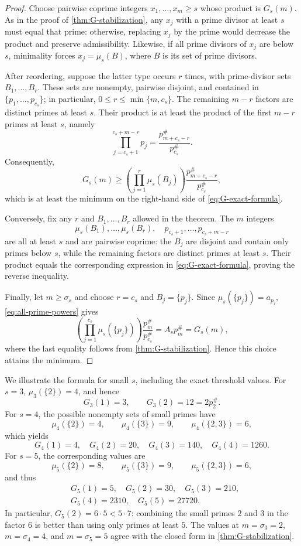 \documentclass[11pt,onecolumn]{IEEEtran}
\newcommand{\primorial}[1]{p_{#1}^{\#}}
\begin{document}
\begin{proof}
Choose pairwise coprime integers $x_1,\ldots,x_m\ge s$
whose product is $G_s(m)$.  As in the proof of
\cref{thm:G-stabilization}, any $x_j$ with a prime divisor
at least $s$ must equal that prime: otherwise, replacing
$x_j$ by the prime would decrease the product and preserve
admissibility.  Likewise, if all prime divisors of $x_j$
are below $s$, minimality forces $x_j=\mu_s(B)$, where
$B$ is its set of prime divisors.

After reordering, suppose the latter type occurs $r$ times,
with prime-divisor sets $B_1,\ldots,B_r$.  These sets are
nonempty, pairwise disjoint, and contained in
$\{p_1,\ldots,p_{c_s}\}$; in particular,
$0\le r\le\min\{m,c_s\}$.  The remaining $m-r$ factors
are distinct primes at least $s$.  Their product is at least
the product of the first $m-r$ primes at least $s$, namely
\[
\prod_{j=c_s+1}^{c_s+m-r}p_j
=\frac{\primorial{m+c_s-r}}{\primorial{c_s}}.
\]
Consequently,
\[
G_s(m)\ge
\left(\prod_{j=1}^{r}\mu_s(B_j)\right)
\frac{\primorial{m+c_s-r}}{\primorial{c_s}},
\]
which is at least the minimum on the right-hand side of
\eqref{eq:G-exact-formula}.

Conversely, fix any $r$ and $B_1,\ldots,B_r$ allowed
in the theorem.  The $m$ integers
\[
\mu_s(B_1),\ldots,\mu_s(B_r),
\quad p_{c_s+1},\ldots,p_{c_s+m-r}
\]
are all at least $s$ and are pairwise coprime: the
$B_j$ are disjoint and contain only primes below $s$,
while the remaining factors are distinct primes at least
$s$.  Their product equals the corresponding expression
in \eqref{eq:G-exact-formula}, proving the reverse
inequality.

Finally, let $m\ge\sigma_s$ and choose $r=c_s$ and
$B_j=\{p_j\}$.  Since $\mu_s(\{p_j\})=a_{p_j}$,
\eqref{eq:all-prime-powers} gives
\[
\left(\prod_{j=1}^{c_s}\mu_s(\{p_j\})\right)
\frac{\primorial{m}}{\primorial{c_s}}
=A_s\primorial{m}=G_s(m),
\]
where the last equality follows from
\cref{thm:G-stabilization}.  Hence this choice attains
the minimum.
\end{proof}

We illustrate the formula for small $s$, including the exact
threshold values.
For $s=3$, $\mu_3(\{2\})=4$, and hence
\[
G_3(1)=3,\qquad G_3(2)=12=2\primorial{2}.
\]
For $s=4$, the possible nonempty sets of small primes
have
\[
\mu_4(\{2\})=4,\qquad
\mu_4(\{3\})=9,\qquad
\mu_4(\{2,3\})=6,
\]
which yields
\[
G_4(1)=4,\quad G_4(2)=20,\quad
G_4(3)=140,\quad G_4(4)=1260.
\]
For $s=5$, the corresponding values are
\[
\mu_5(\{2\})=8,\qquad
\mu_5(\{3\})=9,\qquad
\mu_5(\{2,3\})=6,
\]
and thus
\[
\begin{aligned}
&G_5(1)=5,\quad G_5(2)=30,\quad G_5(3)=210,\\
&G_5(4)=2310,\quad G_5(5)=27720.
\end{aligned}
\]
In particular, $G_5(2)=6\cdot5<5\cdot7$: combining the
small primes $2$ and $3$ in the factor $6$ is better than
using only primes at least $5$.  The values at
$m=\sigma_3=2$, $m=\sigma_4=4$, and $m=\sigma_5=5$
agree with the closed form in \cref{thm:G-stabilization}.
\end{document}
